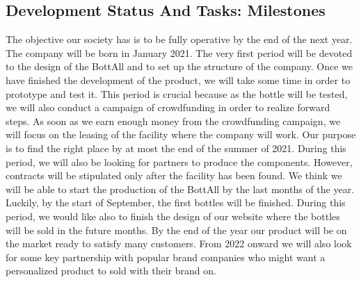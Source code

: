 \subsection{Development Status And Tasks: Milestones}
The objective our society has is to be fully operative by the end of the next year. The company will be born in January 2021. The very first period will be devoted to the design of the BottAll and to set up the structure of the company. Once we have finished the development of the product, we will take some time in order to prototype and test it. This period is crucial because as the bottle will be tested, we will also conduct a campaign of crowdfunding in order to realize forward steps.
As soon as we earn enough money from the crowdfunding campaign, we will focus on the leasing of the facility where the company will work. Our purpose is to find the right place by at most the end of the summer of 2021. During this period, we will also be looking for partners to produce the components. However, contracts will be stipulated only after the facility has been found.
We think we will be able to start the production of the BottAll by the last months of the year. Luckily, by the start of September, the first bottles will be finished. During this period, we would like also to finish the design of our website where the bottles will be sold in the future months.
By the end of the year our product will be on the market ready to satisfy many customers.
From 2022 onward we will also look for some key partnership with popular brand companies who might want a personalized product to sold with their brand on.\\ 
